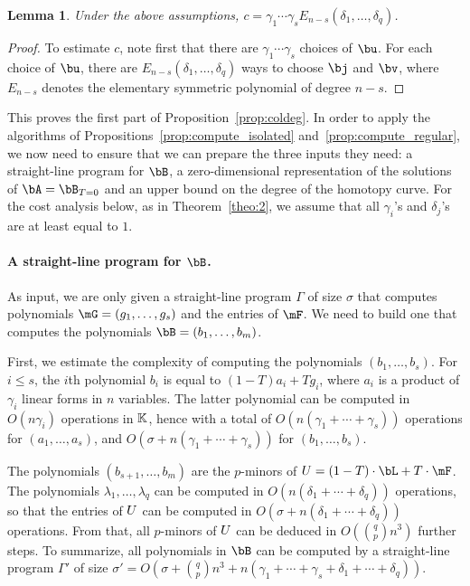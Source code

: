 \documentclass[12pt]{article}
\newtheorem{lemma}[definition]{Lemma}
\begin{document}
\begin{lemma}\label{lemma:column:c_estimate}
  Under the above assumptions, $c=\gamma_1\cdots \gamma_s
  E_{n-s}(\delta_1, \ldots, \delta_q)$.
\end{lemma}
\begin{proof}
  To estimate $c$, note first that there are $\gamma_1\cdots
  \gamma_s$ choices of $\bu$. For each choice of $\bu$, there are
  $E_{n-s}(\delta_1, \ldots, \delta_q)$ ways to
  choose $\bj$ and $\bv$, where $E_{n-s}$ denotes the elementary
  symmetric polynomial of degree $n-s$.   
\end{proof}
This proves the first part of Proposition~\ref{prop:coldeg}.  In order
to apply the algorithms of Propositions~\ref{prop:compute_isolated}
and~\ref{prop:compute_regular}, we now need to ensure that we can
prepare the three inputs they need: a straight-line program for $\bB$,
a zero-dimensional representation of the solutions of $\bA=\bB_{T=0}$ and an upper
bound on the degree of the homotopy curve. For the cost analysis
below, as in Theorem~\ref{theo:2}, we assume that all $\gamma_i$'s and
$\delta_j$'s are at least equal to $1$.

\paragraph{A straight-line program for $\bB$.} 
As input, we are only given a straight-line program $\Gamma$ of size
$\sigma$ that computes polynomials $\mG=(g_1,\dots,g_s)$ and the entries
of $\mF$. We need to build one that computes the polynomials
$\bB=(b_1,\dots,b_m)$.

First, we estimate the complexity of computing the polynomials
$(b_1,\dots,b_s)$. For $i \le s$, the $i$th polynomial $b_i$ is equal
to $(1-T)a_i + T g_i$, where $a_i$ is a product of $\gamma_i$ linear
forms in $n$ variables. The latter polynomial can be computed in $O(n
\gamma_i)$ operations in $\mathbb{K}$, hence with a total of $O(n
(\gamma_1+\cdots+\gamma_s))$ operations for $(a_1,\dots,a_s)$, and
$O(\sigma+n (\gamma_1+\cdots+\gamma_s))$ for $(b_1,\dots,b_s)$.

The polynomials $(b_{s+1},\dots,b_m)$ are the $p$-minors of
$\mU=(1-T)\cdot\bL+T\cdot\mF$.  The polynomials $\lambda_1,\dots,\lambda_q$ can
be computed in $O(n (\delta_1+\cdots+\delta_q))$ operations, so that
the entries of ${U}$ can be computed in $O(\sigma +
n(\delta_1+\cdots+\delta_q))$ operations. From that, all $p$-minors of
${U}$ can be deduced in $O({q \choose p} n^3)$ further steps.  To
summarize, all polynomials in $\bB$ can be computed by a straight-line
program $\Gamma'$ of size $\sigma'=O(\sigma + {q \choose p} n^3 +n(\gamma_1+\cdots+\gamma_s+\delta_1+\cdots+\delta_q))$.
\end{document}
